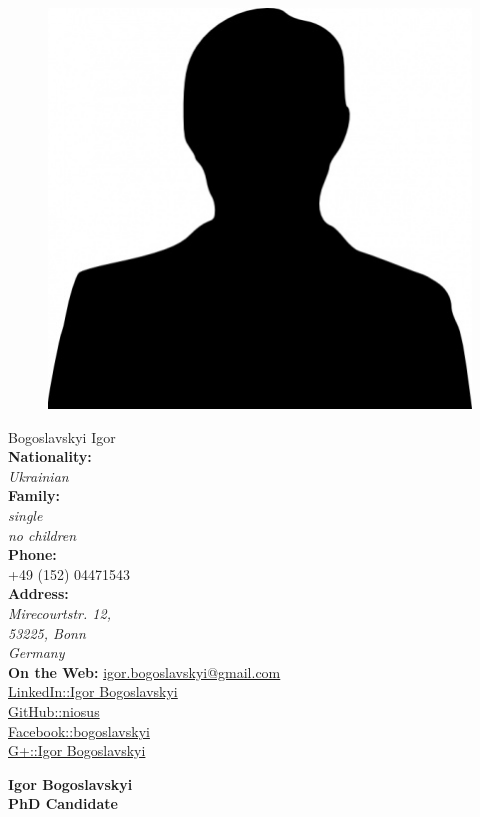 \documentclass[a4paper,12pt,final]{memoir}
\newcommand{\SmallSep}{\vspace{0.5em}}
\begin{document}
\begin{figure}
	\hfill
	\includegraphics[width=0.6\columnwidth]{photo.jpg}
	\vspace{-5cm}
\end{figure}

\begin{flushright}\small
	Bogoslavskyi Igor\\
	\textbf{Nationality:} \emph{\\Ukrainian\\}
	\textbf{Family:} \emph{\\single \\no children\\}
	\SmallSep
	\textbf{Phone:}\\
	+49 (152) 04471543\\
	\textbf{Address:}\\ \emph{Mirecourtstr. 12, \\53225, Bonn \\Germany}\\
	\SmallSep
	\textbf{On the Web:}
	\href{mailto:igor.bogoslavskyi@gmail.com}{igor.bogoslavskyi@gmail.com}\\
	\SmallSep
	\href{http://www.linkedin.com/pub/igor-bogoslavskyi/43/50b/726}{LinkedIn::Igor Bogoslavskyi}\\
	\SmallSep
	\href{https://github.com/niosus}{GitHub::niosus}\\
	\SmallSep
	\href{https://www.facebook.com/bogoslavskyi}{Facebook::bogoslavskyi}\\
	\SmallSep
	\href{https://plus.google.com/118159072920638602239/posts}{G+::Igor Bogoslavskyi}\\
	\SmallSep
\end{flushright}\normalsize
\framebreak


\Huge\bfseries {\color{MidnightBlue} Igor Bogoslavskyi} \\
\Large\bfseries  PhD Candidate \\
\end{document}
